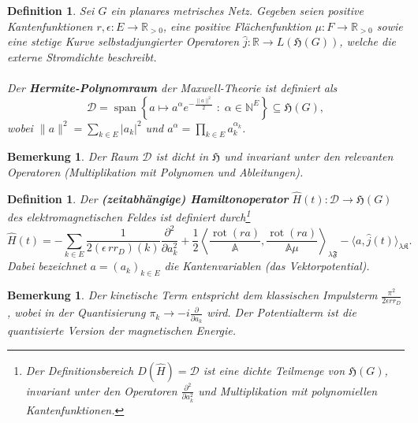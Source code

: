 \documentclass[11pt,a4paper,leqno]{report}
\newtheorem{definition}[theorem]{Definition}
\newtheorem{remark}[theorem]{Bemerkung}
\numberwithin{equation}{chapter}
\begin{document}
\begin{definition} \label{def:hermite_raum}
	Sei \(G\) ein planares metrisches Netz. Gegeben seien positive Kantenfunktionen 
	\(r, \epsilon: E \to \mathbb{R}_{>0}\), eine positive Flächenfunktion 
	\(\mu: F \to \mathbb{R}_{>0}\) sowie eine stetige Kurve selbstadjungierter Operatoren 
	\(\hat{j}: \mathbb{R} \to L(\mathfrak{H}(G))\), welche die externe Stromdichte beschreibt.
	\\
	\\
	Der \textbf{Hermite-Polynomraum} der Maxwell-Theorie ist definiert als
	\begin{equation}
		\mathcal{D} = \operatorname{span}\left\{ a \mapsto a^\alpha e^{-\frac{\|a\|^2}{2}} 
		\;:\; \alpha \in \mathbb{N}^{E} \right\} \subseteq \mathfrak{H}(G),
	\end{equation}
	wobei \(\|a\|^2 = \sum_{k \in E} |a_k|^2\) und \(a^\alpha = \prod_{k \in E} a_k^{\alpha_k}\).
\end{definition}
\begin{remark}
Der Raum \(\mathcal{D}\) ist dicht in \(\mathfrak{H}\) und invariant 
unter den relevanten Operatoren (Multiplikation mit Polynomen und Ableitungen).
\end{remark}
\begin{definition} \label{def:hamilton_operator}
	Der \textbf{(zeitabhängige) Hamiltonoperator} \(\hat{H}(t): \mathcal{D} \to \mathfrak{H}(G)\) 
	des elektromagnetischen Feldes ist definiert durch\footnote{Der Definitionsbereich 
		\(D(\hat{H}) = \mathcal{D}\) ist eine dichte Teilmenge von \(\mathfrak{H}(G)\), 
		invariant unter den Operatoren \(\frac{\partial^2}{\partial a_k^2}\) und Multiplikation 
		mit polynomiellen Kantenfunktionen.}
	\begin{equation} \label{eq:quanten_hamilton}
		\hat{H}(t) = -\sum_{k \in E} \frac{1}{2(\epsilon\,rr_D)(k)} \frac{\partial^2}{\partial a_k^2} 
		+ \frac{1}{2} \left\langle \frac{\operatorname{rot}(r a)}{\mathbb{A}}, 
		\frac{\operatorname{rot}(r a)}{\mathbb{A}\mu} \right\rangle_{\lambda\mathfrak{F}} 
		- \langle a, \hat{j}(t) \rangle_{\lambda\mathfrak{K}}.
	\end{equation}
	Dabei bezeichnet \(a = (a_k)_{k \in E}\) die Kantenvariablen (das Vektorpotential).
\end{definition}
\begin{remark}
Der kinetische Term entspricht dem klassischen Impulsterm 
\(\frac{\pi^2}{2\epsilon rr_D}\), wobei in der Quantisierung 
\(\pi_k \to -i\frac{\partial}{\partial a_k}\) wird. Der Potentialterm ist die 
quantisierte Version der magnetischen Energie.
\end{remark}
\end{document}
